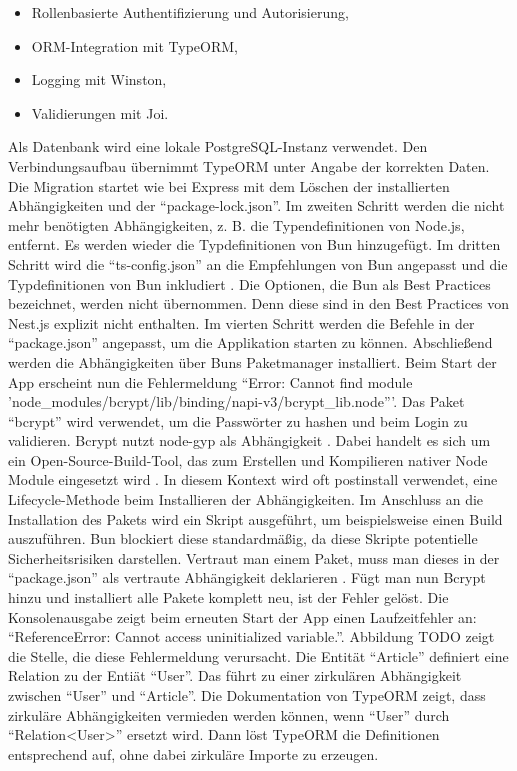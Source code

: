 {\begin{itemize}
	\item Rollenbasierte Authentifizierung und Autorisierung,
	\item ORM-Integration mit TypeORM,
	\item Logging mit Winston,
	\item Validierungen mit Joi.
\end{itemize}

\noindent
Als Datenbank wird eine lokale PostgreSQL-Instanz verwendet. Den Verbindungsaufbau übernimmt TypeORM unter Angabe der korrekten Daten. Die Migration startet wie bei Express mit dem Löschen der installierten Abhängigkeiten und der ``package-lock.json''. Im zweiten Schritt werden die nicht mehr benötigten Abhängigkeiten, z. B. die Typendefinitionen von Node.js, entfernt. Es werden wieder die Typdefinitionen von Bun hinzugefügt. Im dritten Schritt wird die ``ts-config.json'' an die Empfehlungen von Bun angepasst und die Typdefinitionen von Bun inkludiert \cite{OvenSh.2023}. Die Optionen, die Bun als Best Practices bezeichnet, werden nicht übernommen. Denn diese sind in den Best Practices von Nest.js explizit nicht enthalten. Im vierten Schritt werden die Befehle in der ``package.json'' angepasst, um die Applikation starten zu können. Abschließend werden die Abhängigkeiten über Buns Paketmanager installiert.\newline
Beim Start der App erscheint nun die Fehlermeldung ``Error: Cannot find module 'node\_modules/bcrypt/lib/binding/napi-v3/bcrypt\_lib.node'''. Das Paket ``bcrypt'' wird verwendet, um die Passwörter zu hashen und beim Login zu validieren. Bcrypt nutzt node-gyp als Abhängigkeit . Dabei handelt es sich um ein Open-Source-Build-Tool, das zum Erstellen und Kompilieren nativer Node Module eingesetzt wird . In diesem Kontext wird oft postinstall verwendet, eine Lifecycle-Methode beim Installieren der Abhängigkeiten. Im Anschluss an die Installation des Pakets wird ein Skript ausgeführt, um beispielsweise einen Build auszuführen. Bun blockiert diese standardmäßig, da diese Skripte potentielle Sicherheitsrisiken darstellen. Vertraut man einem Paket, muss man dieses in der ``package.json'' als vertraute Abhängigkeit deklarieren . Fügt man nun Bcrypt hinzu und installiert alle Pakete komplett neu, ist der Fehler gelöst. \newline
Die Konsolenausgabe zeigt beim erneuten Start der App einen Laufzeitfehler an: ``ReferenceError: Cannot access uninitialized variable.''. Abbildung TODO zeigt die Stelle, die diese Fehlermeldung verursacht. Die Entität ``Article'' definiert eine Relation zu der Entiät ``User''. Das führt zu einer zirkulären Abhängigkeit zwischen ``User'' und ``Article''. Die Dokumentation von TypeORM zeigt, dass zirkuläre Abhängigkeiten vermieden werden können, wenn ``User'' durch ``Relation<User>'' ersetzt wird. Dann löst TypeORM die Definitionen entsprechend auf, ohne dabei zirkuläre Importe zu erzeugen. \\

}
